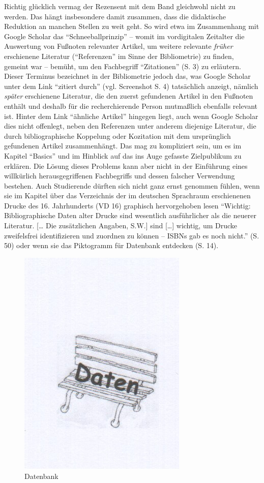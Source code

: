 \documentclass[a4paper,
fontsize=11pt,
oneside,
numbers=noperiodatend,
parskip=half-,
bibliography=totoc,
final
]{scrartcl}
\begin{document}
Richtig glücklich vermag der Rezensent mit dem Band gleichwohl nicht zu
werden. Das hängt insbesondere damit zusammen, dass die didaktische
Reduktion an manchen Stellen zu weit geht. So wird etwa im Zusammenhang
mit Google Scholar das \enquote{Schneeballprinzip} -- womit im
vordigitalen Zeitalter die Auswertung von Fußnoten relevanter Artikel,
um weitere relevante \emph{früher} erschienene Literatur
(\enquote{Referenzen} im Sinne der Bibliometrie) zu finden, gemeint war
-- bemüht, um den Fachbegriff \enquote{Zitationen} (S. 3) zu erläutern.
Dieser Terminus bezeichnet in der Bibliometrie jedoch das, was Google
Scholar unter dem Link \enquote{zitiert durch} (vgl. Screenshot S. 4)
tatsächlich anzeigt, nämlich \emph{später} erschienene Literatur, die
den zuerst gefundenen Artikel in den Fußnoten enthält und deshalb für
die recherchierende Person mutmaßlich ebenfalls relevant ist. Hinter dem
Link \enquote{ähnliche Artikel} hingegen liegt, auch wenn Google Scholar
dies nicht offenlegt, neben den Referenzen unter anderem diejenige
Literatur, die durch bibliographische Koppelung oder Kozitation mit dem
ursprünglich gefundenen Artikel zusammenhängt. Das mag zu kompliziert
sein, um es im Kapitel \enquote{Basics} und im Hinblick auf das ins Auge
gefasste Zielpublikum zu erklären. Die Lösung dieses Problems kann aber
nicht in der Einführung eines willkürlich herausgegriffenen Fachbegriffs
und dessen falscher Verwendung bestehen. Auch Studierende dürften sich
nicht ganz ernst genommen fühlen, wenn sie im Kapitel über das
Verzeichnis der im deutschen Sprachraum erschienenen Drucke des 16.
Jahrhunderts (VD 16) graphisch hervorgehoben lesen \enquote{Wichtig:
Bibliographische Daten alter Drucke sind wesentlich ausführlicher als
die neuerer Literatur. {[}\ldots{} Die zusätzlichen Angaben, S.W.{]}
sind {[}\ldots{}{]} wichtig, um Drucke zweifelsfrei identifizieren und
zuordnen zu können -- ISBNs gab es noch nicht.} (S. 50) oder wenn sie
das Piktogramm für Datenbank entdecken (S. 14).

\begin{figure}[htbp]
\centering
\includegraphics{Datenbank.jpg}
\caption{Datenbank}
\end{figure}
\end{document}
